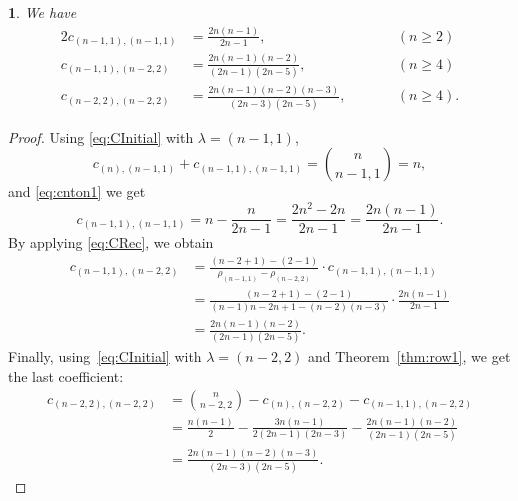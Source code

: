 \documentclass[10pt,oneside,american]{amsart}
\numberwithin{equation}{section}
\numberwithin{figure}{section}
\theoremstyle{plain}
\newtheorem{thm}{\protect\theoremname}[section]
\theoremstyle{definition}
\theoremstyle{remark}
\theoremstyle{plain}
\theoremstyle{definition}
\theoremstyle{plain}
\theoremstyle{plain}
\providecommand{\theoremname}{Theorem}
\begin{document}
\begin{thm}
\label{thm:fam1}
We have
\begin{alignat*}{2}
  c_{(n-1,1),(n-1,1)} &= \frac{2n(n-1)}{2n-1}, &\qquad& (n\geq2) \\
  c_{(n-1,1),(n-2,2)} &= \frac{2n(n-1)(n-2)}{(2n-1)(2n-5)}, && (n\geq4) \\
  c_{(n-2,2),(n-2,2)} &= \frac{2n(n-1)(n-2)(n-3)}{(2n-3)(2n-5)}, &&(n\geq4).
\end{alignat*}
\end{thm}
\begin{proof}
Using \eqref{eq:CInitial} with $\lambda=(n-1,1)$,
\[
  c_{\left(n\right),\left(n-1,1\right)}+c_{\left(n-1,1\right),\left(n-1,1\right)}=\binom{n}{n-1,1}=n,
\]
and \eqref{eq:cnton1} we get
\[
  c_{\left(n-1,1\right),\left(n-1,1\right)}=n-\frac{n}{2n-1}=\frac{2n^{2}-2n}{2n-1}=\frac{2n\left(n-1\right)}{2n-1}.
\]
By applying \eqref{eq:CRec}, we obtain
\begin{align*}
  c_{\left(n-1,1\right),\left(n-2,2\right)}
  &= \frac{\left(n-2+1\right)-\left(2-1\right)}{\rho_{\left(n-1,1\right)}-\rho_{\left(n-2,2\right)}}\cdot c_{(n-1,1),(n-1,1)}\\
  &= \frac{\left(n-2+1\right)-\left(2-1\right)}{\left(n-1\right)n-2n+1-\left(n-2\right)\left(n-3\right)}\cdot\frac{2n\left(n-1\right)}{2n-1}\\
  &= \frac{2n\left(n-1\right)\left(n-2\right)}{\left(2n-1\right)\left(2n-5\right)}.
\end{align*}
Finally, using~\eqref{eq:CInitial} with $\lambda=(n-2,2)$ and
Theorem~\ref{thm:row1}, we get the last coefficient:
\begin{align*}
  c_{\left(n-2,2\right),\left(n-2,2\right)}
  &= \binom{n}{n-2,2}-c_{\left(n\right),\left(n-2,2\right)}-c_{\left(n-1,1\right),\left(n-2,2\right)}\\
  &= \frac{n\left(n-1\right)}{2}-\frac{3n\left(n-1\right)}{2\left(2n-1\right)\left(2n-3\right)}-\frac{2n\left(n-1\right)\left(n-2\right)}{\left(2n-1\right)\left(2n-5\right)}\\
  &= \frac{2n\left(n-1\right)\left(n-2\right)\left(n-3\right)}{\left(2n-3\right)\left(2n-5\right)}.
\end{align*}
\end{proof}
\end{document}
